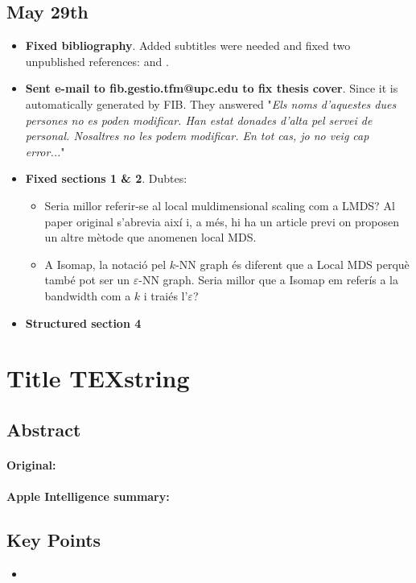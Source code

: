 \documentclass[a4paper,12pt]{article}
\begin{document}
\subsection{May 29th}
\begin{itemize}
    \item \textbf{Fixed bibliography}. Added subtitles were needed and fixed two unpublished references: \cite{Mcqueen2016} and \cite{Salah2020}.
    \item \textbf{Sent e-mail to fib.gestio.tfm@upc.edu to fix thesis cover}. Since it is automatically generated by FIB. They answered "\textit{Els noms d'aquestes dues persones no es poden modificar. Han estat donades d'alta pel servei de personal. Nosaltres no les podem modificar. En tot cas, jo no veig cap error...}"
    \item \textbf{Fixed sections 1 \& 2}. Dubtes: \begin{itemize}
        \item Seria millor referir-se al local muldimensional scaling com a LMDS? Al paper original s'abrevia així i, a més, hi ha un article previ \citep{Venna2006} on proposen un altre mètode que anomenen local MDS.
        \item A Isomap, la notació pel $k$-NN graph és diferent que a Local MDS perquè també pot ser un $\varepsilon$-NN graph. Seria millor que a Isomap em referís a la bandwidth com a $k$ i traiés l'$\varepsilon$? 
    \end{itemize}
    \item \textbf{Structured section 4}
\end{itemize}


\pagebreak
\section{Title \texorpdfstring{TEXstring}{TEXstring}}
\label{sec:}

\subsection{Abstract}

\paragraph{Original:}

\paragraph{Apple Intelligence summary:}


\subsection{Key Points}

\begin{itemize}
    \item 
\end{itemize}


\pagebreak
\printbibliography
\end{document}
